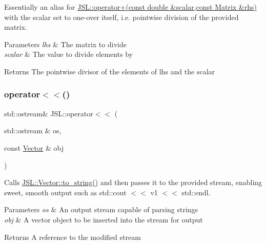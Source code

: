 Essentially an alias for \hyperlink{namespaceJSL_a5f6c1988cf84b088617e0f12fc1e98da}{J\+S\+L\+::operator+(const double \&scalar,const Matrix \&rhs)} with the scalar set to one-\/over itself, i.\+e. pointwise division of the provided matrix. 


\begin{DoxyParams}{Parameters}
{\em lhs} & The matrix to divide \\
\hline
{\em scalar} & The value to divide elements by \\
\hline
\end{DoxyParams}
\begin{DoxyReturn}{Returns}
The pointwise divisor of the elements of lhs and the scalar 
\end{DoxyReturn}
\mbox{\label{namespaceJSL_ad9900d0292867da361ddb3f1200a1f99}} 
\subsubsection{\texorpdfstring{operator$<$$<$()}{operator<<()}\hspace{0.1cm}{\footnotesize\ttfamily [1/2]}}
{\footnotesize\ttfamily std\+::ostream\& J\+S\+L\+::operator$<$$<$ (\begin{DoxyParamCaption}\item[{std\+::ostream \&}]{os,  }\item[{const \hyperlink{classJSL_1_1Vector}{Vector} \&}]{obj }\end{DoxyParamCaption})\hspace{0.3cm}{\ttfamily [inline]}}



Calls \hyperlink{classJSL_1_1Vector_a73579b4a194cc924341806a5d9ea3817}{J\+S\+L\+::\+Vector\+::to\+\_\+string()} and then passes it to the provided stream, enabling sweet, smooth output such as std\+::cout $<$$<$ v1 $<$$<$ std\+::endl. 


\begin{DoxyParams}{Parameters}
{\em os} & An output stream capable of parsing strings \\
\hline
{\em obj} & A vector object to be inserted into the stream for output \\
\hline
\end{DoxyParams}
\begin{DoxyReturn}{Returns}
A reference to the modified stream 
\end{DoxyReturn}
\mbox{\label{namespaceJSL_a91df7f3a77ef2e000058e0f58efb99e6}} 
